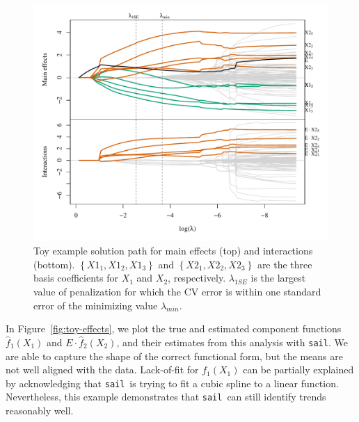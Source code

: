 \documentclass[12pt,letter]{article}\usepackage[]{graphicx}\usepackage[]{color}
\newenvironment{knitrout}{}{} %
\newcommand{\sail}{\texttt{sail}}
\begin{document}
\begin{knitrout}\scriptsize
{}\color{fgcolor}\begin{figure}[H]

{\centering \includegraphics[width=1\linewidth]{figure/toy-solution-path-1} 

}

\caption[Toy example solution path for main effects (top) and interactions (bottom)]{Toy example solution path for main effects (top) and interactions (bottom). $\left\lbrace X1_1, X1_2, X1_3 \right\rbrace$ and $\left\lbrace X2_1, X2_2, X2_3 \right\rbrace$ are the three basis coefficients for $X_1$ and $X_2$, respectively. $\lambda_{1SE}$ is the largest value of penalization for which the CV error is within one standard error of the minimizing value $\lambda_{min}$.}\label{fig:toy-solution-path}
\end{figure}

\end{knitrout}

In Figure~\ref{fig:toy-effects}, we plot the true and estimated component functions $\hat{f}_1(X_1)$ and $E \cdot \hat{f}_2(X_2)$, and their estimates from this analysis with \texttt{sail}.
We are able to capture the shape of the correct functional form, but the means are not well aligned with the data. Lack-of-fit for $f_1(X_1)$ can be partially explained by acknowledging that \sail ~is trying to fit a cubic spline to a linear function.
Nevertheless, this example demonstrates that \sail ~can still identify trends reasonably well.
\end{document}
